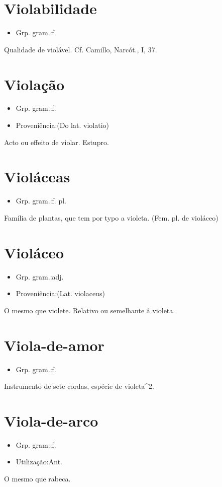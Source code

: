 \documentclass{article}
\begin{document}
\section{Violabilidade}
\begin{itemize}
\item {Grp. gram.:f.}
\end{itemize}
Qualidade de violável. Cf. Camillo, \textunderscore Narcót.\textunderscore , I, 37.
\section{Violação}
\begin{itemize}
\item {Grp. gram.:f.}
\end{itemize}
\begin{itemize}
\item {Proveniência:(Do lat. \textunderscore violatio\textunderscore )}
\end{itemize}
Acto ou effeito de violar.
Estupro.
\section{Violáceas}
\begin{itemize}
\item {Grp. gram.:f. pl.}
\end{itemize}
Família de plantas, que tem por typo a violeta.
(Fem. pl. de \textunderscore violáceo\textunderscore )
\section{Violáceo}
\begin{itemize}
\item {Grp. gram.:adj.}
\end{itemize}
\begin{itemize}
\item {Proveniência:(Lat. \textunderscore violaceus\textunderscore )}
\end{itemize}
O mesmo que \textunderscore violete\textunderscore .
Relativo ou semelhante á violeta.
\section{Viola-de-amor}
\begin{itemize}
\item {Grp. gram.:f.}
\end{itemize}
Instrumento de sete cordas, espécie de violeta^2.
\section{Viola-de-arco}
\begin{itemize}
\item {Grp. gram.:f.}
\end{itemize}
\begin{itemize}
\item {Utilização:Ant.}
\end{itemize}
O mesmo que \textunderscore rabeca\textunderscore .
\end{document}
